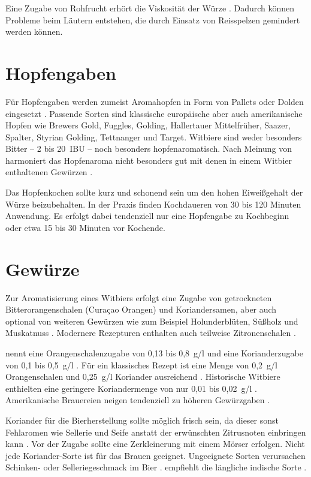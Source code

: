 \documentclass[a4paper,parskip=half]{scrartcl}
\begin{document}
Eine Zugabe von Rohfrucht erhört die Viskosität der Würze \parencite[9]{Strottner1999}.
Dadurch können Probleme beim Läutern entstehen, die durch Einsatz von
Reisspelzen gemindert werden können.

\section*{Hopfengaben}

Für Hopfengaben werden zumeist Aromahopfen in Form von Pallets
oder Dolden eingesetzt \parencite[1]{Strottner1999}. Passende
Sorten sind klassische europäische aber auch amerikanische
Hopfen wie Brewers Gold, Fuggles, Golding, Hallertauer Mittelfrüher,
Saazer, Spalter, Styrian Golding, Tettnanger und Target.
Witbiere sind weder besonders Bitter – 2 bis 20~IBU – noch
besonders hopfenaromatisch. Nach Meinung von \citeauthor{Zainasheff2007}
harmoniert das Hopfenaroma nicht besonders gut mit denen in einem Witbier
enthaltenen Gewürzen \parencite{Zainasheff2007}.

Das Hopfenkochen sollte kurz und schonend sein um den hohen Eiweißgehalt der
Würze beizubehalten. In der Praxis finden Kochdaueren von 30 bis 120
Minuten Anwendung. Es erfolgt dabei tendenziell nur eine Hopfengabe zu
Kochbeginn oder etwa 15 bis 30 Minuten vor Kochende. \parencite[13,17,23-113]{Strottner1999}

\section*{Gewürze}

Zur Aromatisierung eines Witbiers erfolgt eine Zugabe von getrockneten
Bitterorangenschalen (Curaçao Orangen) und Koriandersamen, aber auch
optional von weiteren Gewürzen wie zum Beispiel Holunderblüten,
Süßholz und Muskatnuss \parencite[1]{Strottner1999}. Modernere
Rezepturen enthalten auch teilweise Zitronenschalen \parencites[24]{BA2021}.

\citeauthor{Strottner1999} nennt eine Orangenschalenzugabe von
0,13 bis 0,8~g/l und eine Korianderzugabe
von 0,1 bis 0,5~g/l \parencite[13]{Strottner1999}.
Für ein klassisches Rezept ist eine Menge von 0,2~g/l Orangenschalen
und 0,25~g/l Koriander ausreichend \parencite[29]{Sparrow2002}.
Historische Witbiere enthielten eine geringere Koriandermenge
von nur 0,01 bis 0,02~g/l \parencite[40]{Hieronymus2010}.
Amerikanische Brauereien neigen tendenziell zu höheren
Gewürzgaben \parencite[26]{Strong2021}.

Koriander für die Bierherstellung sollte möglich frisch sein, da
dieser sonst Fehlaromen wie Sellerie und Seife anstatt der erwünschten
Zitrusnoten einbringen kann \parencite[26]{Strong2021}. Vor der Zugabe
sollte eine Zerkleinerung mit einem Mörser erfolgen.
Nicht jede Koriander-Sorte ist für das Brauen geeignet. Ungeeignete
Sorten verursachen Schinken- oder Selleriegeschmack im Bier
\parencites[48]{BJCP2015}. \citeauthor{Mosher2015} empfiehlt die längliche
indische Sorte \parencite[338\psq]{Mosher2015}.
\end{document}
